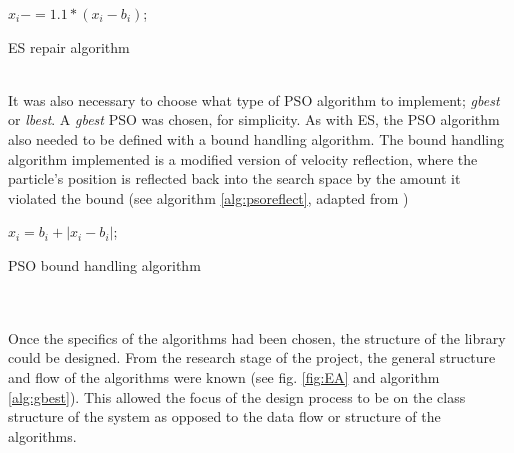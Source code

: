 \begin{algorithm}[h]
\label{alg:esrepair}
  \SetAlgoLined
   {
    $x_{i} -= 1.1 * (x_{i} - b_{i})$;
  } 
  \caption{ES repair algorithm}
\end{algorithm}
\\It was also necessary to choose what type of PSO algorithm to implement; \emph{gbest} or \emph{lbest}. A \emph{gbest} PSO was chosen, for simplicity.  As with ES, the PSO algorithm also needed to be defined with a bound handling algorithm. The bound handling algorithm implemented is a modified version of velocity reflection, where the particle's position is reflected back into the search space by the amount it violated the bound (see algorithm \ref{alg:psoreflect}, adapted from \cite{reflect})
\begin{algorithm}[h]
\label{alg:psoreflect}
  \SetAlgoLined
   {
    { 
      $x_{i} = b_{i} + |x_{i} - b_{i}|$;
    }
  } 
  \caption{PSO bound handling algorithm}
\end{algorithm}
\\\\Once the specifics of the algorithms had been chosen, the structure of the library could be designed. From the research stage of the project, the general structure and flow of the algorithms were known (see fig. \ref{fig:EA} and algorithm \ref{alg:gbest}). This allowed the focus of the design process to be on the class structure of the system as opposed to the data flow or structure of the algorithms.

